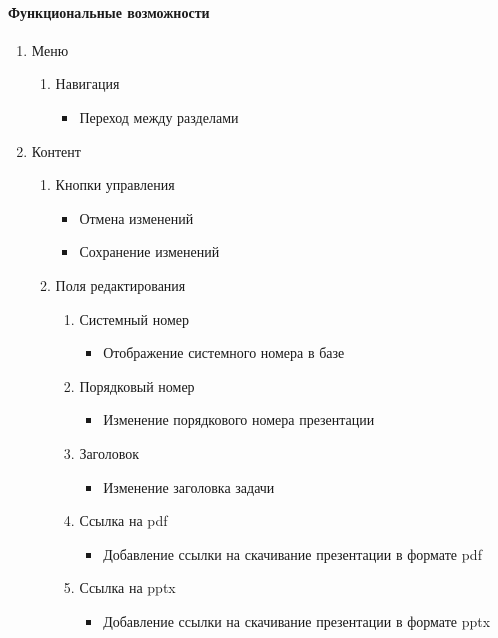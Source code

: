 \paragraph{Функциональные возможности}
\begin{enumerate}
	\item Меню
	\begin{enumerate}
		\item Навигация
		\begin{itemize}
			\item Переход между разделами
		\end{itemize}
	\end{enumerate}

	\item Контент
	\begin{enumerate}
		\item Кнопки управления
		\begin{itemize}
			\item Отмена изменений
			\item Сохранение изменений
		\end{itemize}

		\item Поля редактирования
		\begin{enumerate}
			\item Системный номер
			\begin{itemize}
				\item Отображение системного номера в базе
			\end{itemize}

			\item Порядковый номер
			\begin{itemize}
				\item Изменение порядкового номера презентации
			\end{itemize}

			\item Заголовок
			\begin{itemize}
				\item Изменение заголовка задачи
			\end{itemize}

			\item Ссылка на pdf
			\begin{itemize}
				\item Добавление ссылки на скачивание презентации в формате pdf
			\end{itemize}

			\item Ссылка на pptx
			\begin{itemize}
				\item Добавление ссылки на скачивание презентации в формате pptx
			\end{itemize}


\end{enumerate}
\end{enumerate}
\end{enumerate}

